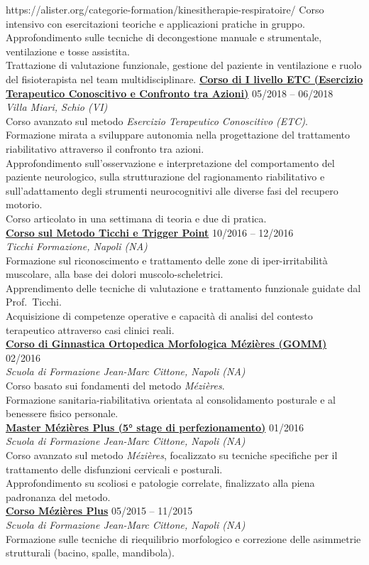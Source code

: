\documentclass[a4paper]{article}
\newcommand{\voice}[5]{\href{#4}{\textbf{#1}} \hfill #2 \\ \textit{#3} \\ {\small #5} \vspace{0.2cm} \\}
\begin{document}
    {https://alister.org/categorie-formation/kinesitherapie-respiratoire/}
    {
    Corso intensivo con esercitazioni teoriche e applicazioni pratiche in gruppo.\\
    Approfondimento sulle tecniche di decongestione manuale e strumentale, ventilazione e tosse assistita.\\
    Trattazione di valutazione funzionale, gestione del paziente in ventilazione e ruolo del fisioterapista nel team multidisciplinare.
    \vspace{-1em}}
    \voice{Corso di I livello ETC (Esercizio Terapeutico Conoscitivo e Confronto tra Azioni)}
    {05/2018 -- 06/2018}
    {Villa Miari, Schio (VI)}
    {https://riabilitazioneneurocognitiva.it/wp-content/uploads/2023/01/Progr-note-organ-corso-di-1-liv-2023-24.pdf}
    {
    Corso avanzato sul metodo \emph{Esercizio Terapeutico Conoscitivo (ETC)}.\\
    Formazione mirata a sviluppare autonomia nella progettazione del trattamento riabilitativo attraverso il confronto tra azioni.\\
    Approfondimento sull’osservazione e interpretazione del comportamento del paziente neurologico, sulla strutturazione del ragionamento riabilitativo e sull’adattamento degli strumenti neurocognitivi alle diverse fasi del recupero motorio.\\
    Corso articolato in una settimana di teoria e due di pratica.
    }
    \voice{Corso sul Metodo Ticchi e Trigger Point}
    {10/2016 -- 12/2016}
    {Ticchi Formazione, Napoli (NA)}
    {https://www.metodoticchi.com/}
    {
    Formazione sul riconoscimento e trattamento delle zone di iper-irritabilità muscolare, alla base dei dolori muscolo-scheletrici.\\
    Apprendimento delle tecniche di valutazione e trattamento funzionale guidate dal Prof.\ Ticchi.\\
    Acquisizione di competenze operative e capacità di analisi del contesto terapeutico attraverso casi clinici reali.
    }
    \voice{Corso di Ginnastica Ortopedica Morfologica Mézières (GOMM)}
    {02/2016}
    {Scuola di Formazione Jean-Marc Cittone, Napoli (NA)}
    {https://mezieresacademy.com/}
    {
    Corso basato sui fondamenti del metodo \emph{Mézières}.\\
    Formazione sanitaria-riabilitativa orientata al consolidamento posturale e al benessere fisico personale.
    }
    \voice{Master Mézières Plus (5° stage di perfezionamento)}
    {01/2016}
    {Scuola di Formazione Jean-Marc Cittone, Napoli (NA)}
    {https://mezieresacademy.com/}
    {
    Corso avanzato sul metodo \emph{Mézières}, focalizzato su tecniche specifiche per il trattamento delle disfunzioni cervicali e posturali.\\
    Approfondimento su scoliosi e patologie correlate, finalizzato alla piena padronanza del metodo.
    }
    \voice{Corso Mézières Plus}
    {05/2015 -- 11/2015}
    {Scuola di Formazione Jean-Marc Cittone, Napoli (NA)}
    {https://mezieresacademy.com/}{
    Formazione sulle tecniche di riequilibrio morfologico e correzione delle asimmetrie strutturali (bacino, spalle, mandibola).
    }
\end{document}
